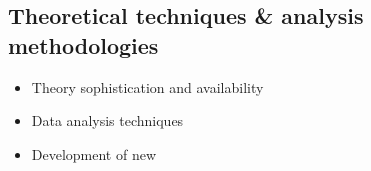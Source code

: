 \subsection{Theoretical techniques \& analysis methodologies}

\begin{itemize}
\item Theory sophistication and availability
\item Data analysis techniques
\item Development of new 
\end{itemize}